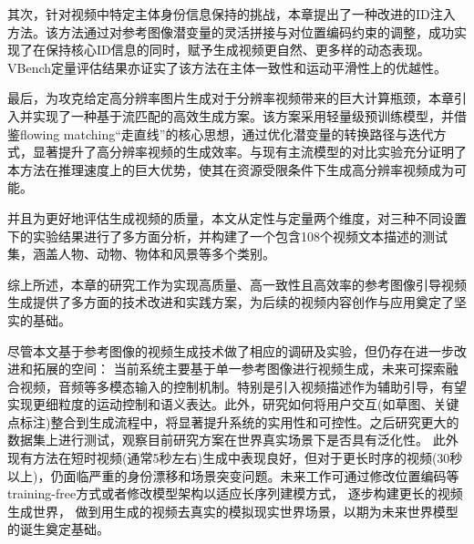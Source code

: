 其次，针对视频中特定主体身份信息保持的挑战，本章提出了一种改进的ID注入方法。该方法通过对参考图像潜变量的灵活拼接与对位置编码约束的调整，成功实现了在保持核心ID信息的同时，赋予生成视频更自然、更多样的动态表现。VBench定量评估结果亦证实了该方法在主体一致性和运动平滑性上的优越性。

最后，为攻克给定高分辨率图片生成对于分辨率视频带来的巨大计算瓶颈，本章引入并实现了一种基于流匹配的高效生成方案。该方案采用轻量级预训练模型，并借鉴flowing matching“走直线”的核心思想，通过优化潜变量的转换路径与迭代方式，显著提升了高分辨率视频的生成效率。与现有主流模型的对比实验充分证明了本方法在推理速度上的巨大优势，使其在资源受限条件下生成高分辨率视频成为可能。

并且为更好地评估生成视频的质量，本文从定性与定量两个维度，对三种不同设置下的实验结果进行了多方面分析，并构建了一个包含108个视频文本描述的测试集，涵盖人物、动物、物体和风景等多个类别。


综上所述，本章的研究工作为实现高质量、高一致性且高效率的参考图像引导视频生成提供了多方面的技术改进和实践方案，为后续的视频内容创作与应用奠定了坚实的基础。

尽管本文基于参考图像的视频生成技术做了相应的调研及实验，但仍存在进一步改进和拓展的空间：
当前系统主要基于单一参考图像进行视频生成，未来可探索融合视频，音频等多模态输入的控制机制。特别是引入视频描述作为辅助引导，有望实现更细粒度的运动控制和语义表达。此外，研究如何将用户交互(如草图、关键点标注)整合到生成流程中，将显著提升系统的实用性和可控性。之后研究更大的数据集上进行测试，观察目前研究方案在世界真实场景下是否具有泛化性。
此外现有方法在短时视频(通常5秒左右)生成中表现良好，但对于更长时序的视频(30秒以上)，仍面临严重的身份漂移和场景突变问题。未来工作可通过修改位置编码等training-free方式或者修改模型架构以适应长序列建模方式， 逐步构建更长的视频生成世界， 做到用生成的视频去真实的模拟现实世界场景，以期为未来世界模型的诞生奠定基础。
